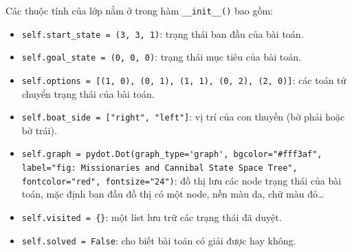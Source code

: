 \documentclass[a4paper, 11pt]{article}
\begin{document}
Các thuộc tính của lớp nằm ở trong hàm \lstinline|__init__()| bao gồm:
\begin{itemize}
    \item \lstinline|self.start_state = (3, 3, 1)|: trạng thái ban đầu của bài toán.
    \item \lstinline|self.goal_state = (0, 0, 0)|: trạng thái mục tiêu của bài toán.
    \item \lstinline|self.options = [(1, 0), (0, 1), (1, 1), (0, 2), (2, 0)]|: các toán tử chuyển trạng thái của bài toán.
    \item \lstinline|self.boat_side = ["right", "left"]|: vị trí của con thuyền (bờ phải hoặc bờ trái).
    \item \lstinline|self.graph = pydot.Dot(graph_type='graph', bgcolor="#fff3af", label="fig: Missionaries and Cannibal State Space Tree", fontcolor="red", fontsize="24")|: đồ thị lưu các node trạng thái của bài toán, mặc định ban đầu đồ thị có một node, nền màu da, chữ màu đỏ\dots
    \item \lstinline|self.visited = {}|: một list lưu trữ các trạng thái đã duyệt.
    \item \lstinline|self.solved = False|: cho biết bài toán có giải được hay không.
\end{itemize}
\end{document}
